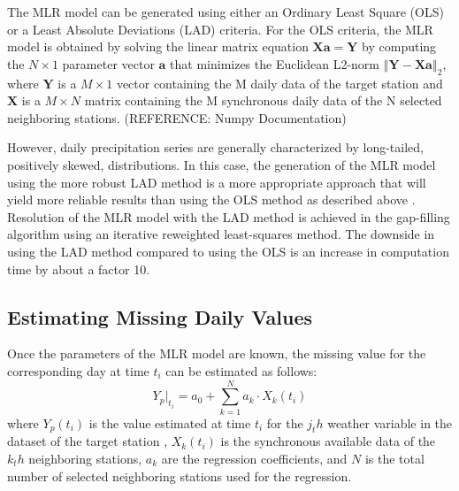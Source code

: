 \documentclass[TechnicalNoteMeteo.tex]{subfiles}
\begin{document}
The MLR model can be generated using either an Ordinary Least Square (OLS) or a Least Absolute Deviations (LAD) criteria. For the OLS criteria, the MLR model is obtained by solving the linear matrix equation $\mathbf{X}\mathbf{a} = \mathbf{Y}$ by computing the $N \times 1$ parameter vector $\mathbf{a}$ that minimizes the Euclidean L2-norm $\left\Vert \mathbf{Y}-\mathbf{X}\mathbf{a} \right\Vert_2$, where $\mathbf{Y}$ is a $M \times 1$ vector containing the M daily data of the target station and $\mathbf{X}$ is a $M \times N$ matrix containing the M synchronous daily data of the N selected neighboring stations. (REFERENCE: Numpy Documentation)

However, daily precipitation series are generally characterized by long-tailed, positively skewed, distributions. In this case, the generation of the MLR model using the more robust LAD method is a more appropriate approach that will yield more reliable results than using the OLS method as described above \cite{menke_geophysical_1989,eischeid_creating_2000}. Resolution of the MLR model with the LAD method is achieved in the gap-filling algorithm using an iterative reweighted least-squares method. The downside in using the LAD method compared to using the OLS is an increase in computation time by about a factor 10.



\subsection{Estimating Missing Daily Values}\label{sec:est_miss_values}

Once the parameters of the MLR model are known, the missing value for the corresponding day at time $t_i$ can be estimated as follows:
%
\begin{equation}
    Y_p\vert_{t_i} = a_0 + \sum_{k=1}^{N} a_k \cdot X_k(t_i)
\end{equation}
%
where $Y_p(t_i)$ is the value estimated at time $t_i$ for the $j_th$ weather variable in the dataset of the target station , $X_k(t_i)$ is the synchronous available data of the $k_th$ neighboring stations, $a_k$ are the regression coefficients, and $N$ is the total number of selected neighboring stations used for the regression.
\end{document}
